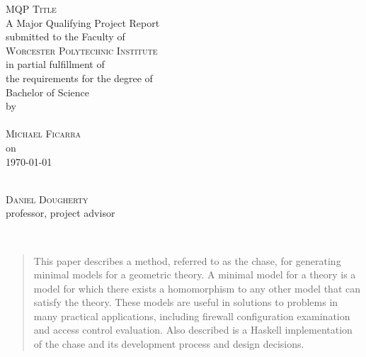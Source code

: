 \documentclass[11pt, a4paper]{article}
\begin{document}
\begin{titlepage}
\begin{center}
	\textsc{\huge MQP Title }\\[1cm]
	A Major Qualifying Project Report\\
	submitted to the Faculty of\\[0.7cm]
	\textsc{ \large Worcester Polytechnic Institute }\\[0.7cm]
	in partial fulfillment of\\
	the requirements for the degree of\\
	Bachelor of Science\\[1cm]
	by\\[1cm]
	~\hspace{2cm}\dotfill\hspace{2cm}~\\
	\textsc{\Large Michael Ficarra}\\[1cm]
	on\\[1cm]
	{\Large \today}\\
	\vfill
	\begin{flushright}
		\hspace{8cm}\dotfill \\
		\textsc{Daniel Dougherty}\\
		professor, project advisor\\
	\end{flushright}
\end{center}
\end{titlepage}


~\\
\vfill
\begin{abstract}
This paper describes a method, referred to as the chase, for generating minimal
models for a geometric theory. A minimal model for a theory is a model for
which there exists a homomorphism to any other model that can satisfy the
theory. These models are useful in solutions to problems in many practical
applications, including firewall configuration examination and access control
evaluation. Also described is a Haskell implementation of the chase and its
development process and design decisions.
\end{abstract}
\vfill
~\\
\newpage

\renewcommand{\contentsname}{Table of Contents}
\tableofcontents \newpage
\listoffigures \newpage
\listoftables \newpage

\end{document}
